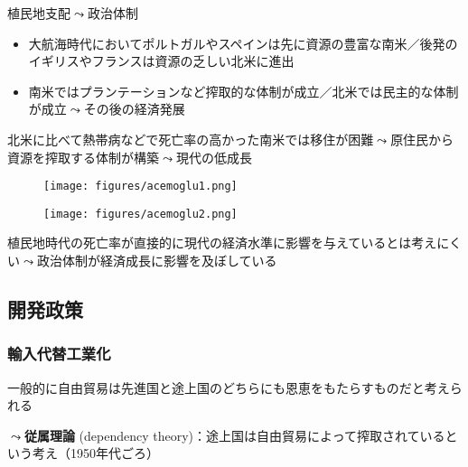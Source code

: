 \documentclass[
  xelatex,
  ja=standard]{bxjsarticle}
\providecommand{\tightlist}{%
  \setlength{\itemsep}{0pt}\setlength{\parskip}{0pt}}\usepackage{longtable,booktabs,array}
\begin{document}
植民地支配\(\leadsto\)政治体制

\begin{itemize}
\tightlist
\item
  大航海時代においてポルトガルやスペインは先に資源の豊富な南米／後発のイギリスやフランスは資源の乏しい北米に進出
\item
  南米ではプランテーションなど搾取的な体制が成立／北米では民主的な体制が成立\(\leadsto\)その後の経済発展\citep{engerman2000, acemoglu2016}
\end{itemize}

北米に比べて熱帯病などで死亡率の高かった南米では移住が困難\(\leadsto\)原住民から資源を搾取する体制が構築\(\leadsto\)現代の低成長\citep{acemoglu2001}

\begin{figure}[htpb]

{\centering \texttt{[image: figures/acemoglu1.png]}

}

\caption{\citet{acemoglu2001}}

\end{figure}

\begin{figure}[htpb]

{\centering \texttt{[image: figures/acemoglu2.png]}

}

\caption{\citet{acemoglu2001}}

\end{figure}

植民地時代の死亡率が直接的に現代の経済水準に影響を与えているとは考えにくい\(\leadsto\)政治体制が経済成長に影響を及ぼしている

\hypertarget{ux958bux767aux653fux7b56}{%
\subsection{開発政策}\label{ux958bux767aux653fux7b56}}

\hypertarget{ux8f38ux5165ux4ee3ux66ffux5de5ux696dux5316}{%
\subsubsection{輸入代替工業化}\label{ux8f38ux5165ux4ee3ux66ffux5de5ux696dux5316}}

一般的に自由貿易は先進国と途上国のどちらにも恩恵をもたらすものだと考えられる

\(\leadsto\)\textbf{従属理論} (dependency
theory)：途上国は自由貿易によって搾取されているという考え（1950年代ごろ）
\end{document}
